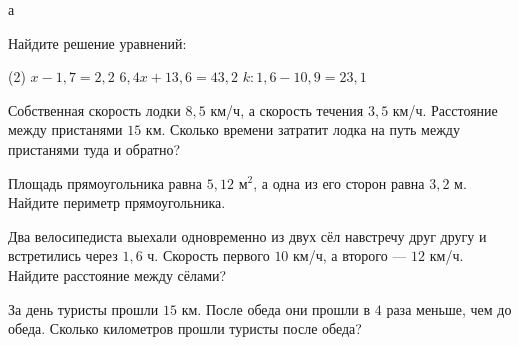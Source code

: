 \begin{class}[number=4]
	\begin{listofex}
		\item а
	\end{listofex}
\end{class}

\begin{homework}[number=2]
	\begin{listofex}
		\item Найдите решение уравнений: \begin{tasks}(2)
			\task \( x - 1,7=2,2 \)
			\task \( 6,4x+ 13,6 = 43,2 \)
			\task \( k : 1,6 - 10,9 = 23,1 \)
		\end{tasks}
		\item Собственная скорость лодки \( 8,5 \) км/ч, а скорость течения \( 3,5 \) км/ч. Расстояние между пристанями \( 15 \) км. Сколько времени затратит лодка на путь между пристанями туда и обратно?
		\item Площадь прямоугольника равна \( 5,12 \) м\( ^{2} \), а одна из его сторон равна \( 3,2 \) м. Найдите периметр прямоугольника.
		\item Два велосипедиста выехали одновременно из двух сёл навстречу друг другу и встретились через \( 1,6 \) ч. Скорость первого \( 10 \) км/ч, а второго --- \( 12 \) км/ч. Найдите расстояние между сёлами?
		\item За день туристы прошли \( 15 \) км. После обеда они прошли в \( 4 \) раза меньше, чем до обеда. Сколько километров прошли туристы после обеда?
	\end{listofex}
\end{homework}

